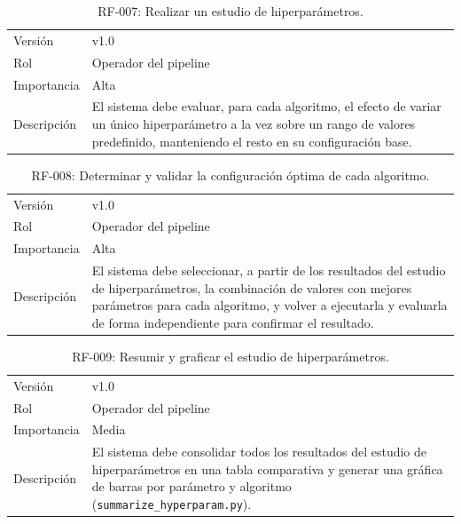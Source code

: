\begin{table}[htp]
\centering
\caption{RF-007: Realizar un estudio de hiperparámetros.}
\label{tab:rf-007}
\renewcommand{\arraystretch}{1.2}
\begin{tabular}{|p{3.1cm}|p{9.2cm}|}
\hline
\rowcolor{gray!25}
\multicolumn{2}{|l|}{\textbf{RF-007 -- Realizar un estudio de hiperparámetros}} \\
\hline
Versión & v1.0 \\
\hline
Rol & Operador del pipeline \\
\hline
Importancia & Alta \\
\hline
Descripción & El sistema debe evaluar, para cada algoritmo, el efecto de
  variar un único hiperparámetro a la vez sobre un rango de valores
  predefinido, manteniendo el resto en su configuración base. \\
\hline
\end{tabular}
\end{table}

\begin{table}[htp]
\centering
\caption{RF-008: Determinar y validar la configuración óptima de cada algoritmo.}
\label{tab:rf-008}
\renewcommand{\arraystretch}{1.2}
\begin{tabular}{|p{3.1cm}|p{9.2cm}|}
\hline
\rowcolor{gray!25}
\multicolumn{2}{|l|}{\textbf{RF-008 -- Determinar y validar la configuración óptima de cada algoritmo}} \\
\hline
Versión & v1.0 \\
\hline
Rol & Operador del pipeline \\
\hline
Importancia & Alta \\
\hline
Descripción & El sistema debe seleccionar, a partir de los resultados del
  estudio de hiperparámetros, la combinación de valores con mejores parámetros
  para cada algoritmo, y volver a ejecutarla y evaluarla de forma independiente
  para confirmar el resultado. \\
\hline
\end{tabular}
\end{table}

\begin{table}[htp]
\centering
\caption{RF-009: Resumir y graficar el estudio de hiperparámetros.}
\label{tab:rf-009}
\renewcommand{\arraystretch}{1.2}
\begin{tabular}{|p{3.1cm}|p{9.2cm}|}
\hline
\rowcolor{gray!25}
\multicolumn{2}{|l|}{\textbf{RF-009 -- Resumir y graficar el estudio de hiperparámetros}} \\
\hline
Versión & v1.0 \\
\hline
Rol & Operador del pipeline \\
\hline
Importancia & Media \\
\hline
Descripción & El sistema debe consolidar todos los resultados del estudio
  de hiperparámetros en una tabla comparativa y generar una gráfica de
  barras por parámetro y algoritmo (\texttt{summarize\_hyperparam.py}). \\
\hline
\end{tabular}
\end{table}

